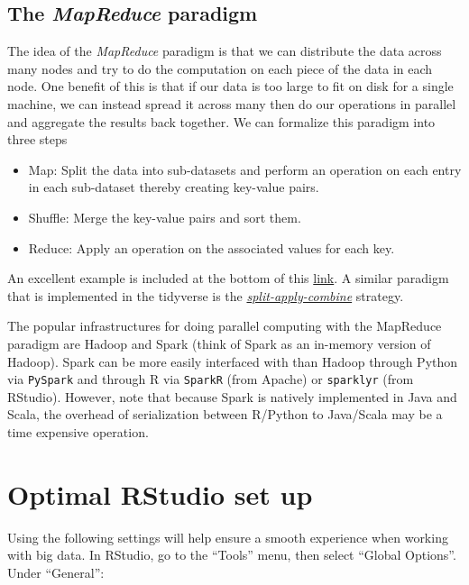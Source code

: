 \documentclass[
]{book}
\providecommand{\tightlist}{%
  \setlength{\itemsep}{0pt}\setlength{\parskip}{0pt}}
\begin{document}
\subsection{\texorpdfstring{The \emph{MapReduce} paradigm}{The MapReduce paradigm}}\label{the-mapreduce-paradigm}

The idea of the \emph{MapReduce} paradigm is that we can distribute the data across many nodes and try to do the computation on each piece of the data in each node. One benefit of this is that if our data is too large to fit on disk for a single machine, we can instead spread it across many then do our operations in parallel and aggregate the results back together. We can formalize this paradigm into three steps

\begin{itemize}
\tightlist
\item
  Map: Split the data into sub-datasets and perform an operation on each entry in each sub-dataset thereby creating key-value pairs.
\item
  Shuffle: Merge the key-value pairs and sort them.
\item
  Reduce: Apply an operation on the associated values for each key.
\end{itemize}

An excellent example is included at the bottom of this \href{https://www.journaldev.com/8848/mapreduce-algorithm-example}{link}. A similar paradigm that is implemented in the tidyverse is the \href{https://www.jstatsoft.org/article/view/v040i01}{\emph{split-apply-combine}} strategy.

The popular infrastructures for doing parallel computing with the MapReduce paradigm are Hadoop and Spark (think of Spark as an in-memory version of Hadoop). Spark can be more easily interfaced with than Hadoop through Python via \texttt{PySpark} and through R via \texttt{SparkR} (from Apache) or \texttt{sparklyr} (from RStudio). However, note that because Spark is natively implemented in Java and Scala, the overhead of serialization between R/Python to Java/Scala may be a time expensive operation.

\section{Optimal RStudio set up}\label{optimal-rstudio-set-up}

Using the following settings will help ensure a smooth experience when working with big data. In RStudio, go to the ``Tools'' menu, then select ``Global Options''. Under ``General'':
\end{document}
